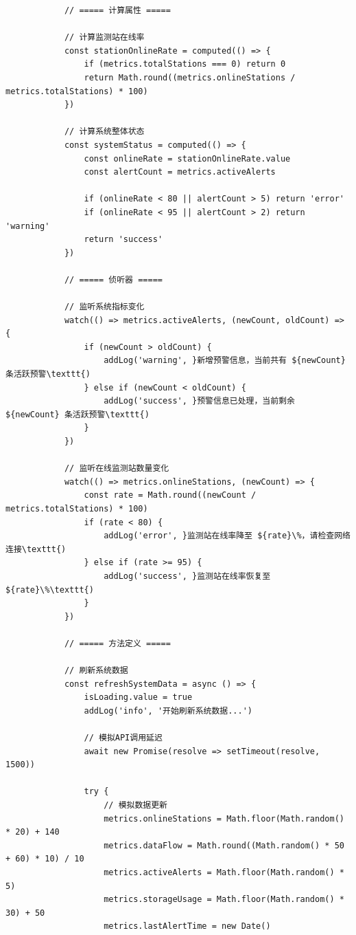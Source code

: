 {{\begin{verbatim}
            // ===== 计算属性 =====
            
            // 计算监测站在线率
            const stationOnlineRate = computed(() => {
                if (metrics.totalStations === 0) return 0
                return Math.round((metrics.onlineStations / metrics.totalStations) * 100)
            })
            
            // 计算系统整体状态
            const systemStatus = computed(() => {
                const onlineRate = stationOnlineRate.value
                const alertCount = metrics.activeAlerts
                
                if (onlineRate < 80 || alertCount > 5) return 'error'
                if (onlineRate < 95 || alertCount > 2) return 'warning'
                return 'success'
            })
            
            // ===== 侦听器 =====
            
            // 监听系统指标变化
            watch(() => metrics.activeAlerts, (newCount, oldCount) => {
                if (newCount > oldCount) {
                    addLog('warning', }新增预警信息，当前共有 ${newCount} 条活跃预警\texttt{)
                } else if (newCount < oldCount) {
                    addLog('success', }预警信息已处理，当前剩余 ${newCount} 条活跃预警\texttt{)
                }
            })
            
            // 监听在线监测站数量变化
            watch(() => metrics.onlineStations, (newCount) => {
                const rate = Math.round((newCount / metrics.totalStations) * 100)
                if (rate < 80) {
                    addLog('error', }监测站在线率降至 ${rate}\%，请检查网络连接\texttt{)
                } else if (rate >= 95) {
                    addLog('success', }监测站在线率恢复至 ${rate}\%\texttt{)
                }
            })
            
            // ===== 方法定义 =====
            
            // 刷新系统数据
            const refreshSystemData = async () => {
                isLoading.value = true
                addLog('info', '开始刷新系统数据...')
                
                // 模拟API调用延迟
                await new Promise(resolve => setTimeout(resolve, 1500))
                
                try {
                    // 模拟数据更新
                    metrics.onlineStations = Math.floor(Math.random() * 20) + 140
                    metrics.dataFlow = Math.round((Math.random() * 50 + 60) * 10) / 10
                    metrics.activeAlerts = Math.floor(Math.random() * 5)
                    metrics.storageUsage = Math.floor(Math.random() * 30) + 50
                    metrics.lastAlertTime = new Date()
                    

\end{verbatim}}}
